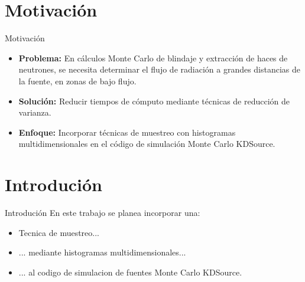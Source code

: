 \documentclass[aspectratio=169,english]{beamer}
\begin{document}








\section{Motivación}
\begin{frame}{Motivación}
    \begin{itemize}[itemsep=1.5em]
        \item \textbf{Problema:} En cálculos Monte Carlo de blindaje y extracción de haces de neutrones, se necesita determinar el flujo de radiación a grandes distancias de la fuente, en zonas de bajo flujo.
        \item \textbf{Solución:} Reducir tiempos de cómputo mediante técnicas de reducción de varianza.
        \item \textbf{Enfoque:} Incorporar técnicas de muestreo con histogramas multidimensionales en el código de simulación Monte Carlo KDSource.
    \end{itemize}
\end{frame}


\section{Introdución}
\begin{frame}{Introdución}
    En este trabajo se planea incorporar una:
    \begin{itemize}[itemsep=1.5em]
        \item Tecnica de muestreo...
        \item ... mediante histogramas multidimensionales...
        \item ... al codigo de simulacion de fuentes Monte Carlo KDSource.
    \end{itemize}
\end{frame}
\end{document}
